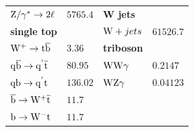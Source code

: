 \begin{table}[htb]
\begin{tabular}[width=\textwidth]{ll|ll}
  $\mathrm{Z}/\gamma^{*}\to2\ell$                           & $5765.4$                             & \textbf{W jets}                              &                                      \\
  \textbf{single top}                              &                                      & $\mathrm{W}+jets$                                   & $61526.7$                            \\
  $\mathrm{W^+}\to\mathrm{t}\overline{\mathrm{b}}$                             & $3.36$                               & \textbf{triboson}                            &                                      \\
  $\mathrm{q}\overline{\mathrm{b}}\to\mathrm{q}^{'}\overline{\mathrm{t}}$                    & $80.95$                              & $\mathrm{W}\mathrm{W}\gamma$                                 & $0.2147$                             \\
  $\mathrm{q}\mathrm{b}\to\mathrm{q}^{'}\mathrm{t}$                      & $136.02$                             & $\mathrm{W}\mathrm{Z}\gamma$                                 & $0.04123$                            \\
  $\overline{\mathrm{b}}\to\mathrm{W^+}\overline{\mathrm{t}}$                            & $11.7$                               &                                              &                                      \\
  $\mathrm{b}\to\mathrm{W^-}\mathrm{t}$                              & $11.7$                               &                                              &                                      \\
  \hline
 \end{tabular}
\end{table}



